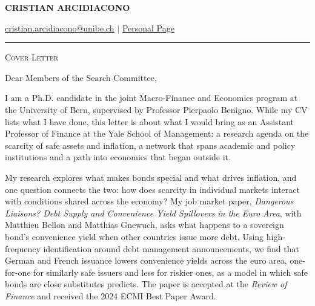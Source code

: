 \documentclass[11pt]{article}
\begin{document}
 
\begin{center}
    \textbf{\large \scshape CRISTIAN ARCIDIACONO}
\end{center}

\begin{center}
    {\href{mailto:cristian.arcidiacono@unibe.ch}{cristian.arcidiacono@unibe.ch} $\vert$ \href{https://sites.google.com/view/cristian-arcidiacono/home}{Personal Page}}
\end{center}
\vspace{-0.2cm}
\noindent\rule{\textwidth}{0.4pt}

\vspace{0.2cm}

\begin{center}
    {\large \scshape Cover Letter}
\end{center}

\vspace{0.3cm}

Dear Members of the Search Committee,

I am a Ph.D. candidate in the joint Macro-Finance and Economics program at the University of Bern, supervised by Professor Pierpaolo Benigno. While my CV lists what I have done, this letter is about what I would bring as an Assistant Professor of Finance at the Yale School of Management: a research agenda on the scarcity of safe assets and inflation, a network that spans academic and policy institutions and a path into economics that began outside it.

My research explores what makes bonds special and what drives inflation, and one question connects the two: how does scarcity in individual markets interact with conditions shared across the economy? My job market paper, \textit{Dangerous Liaisons? Debt Supply and Convenience Yield Spillovers in the Euro Area}, with Matthieu Bellon and Matthias Gnewuch, asks what happens to a sovereign bond's convenience yield when other countries issue more debt. Using high-frequency identification around debt management announcements, we find that German and French issuance lowers convenience yields across the euro area, one-for-one for similarly safe issuers and less for riskier ones, as a model in which safe bonds are close substitutes predicts. The paper is accepted at the \textit{Review of Finance} and received the 2024 ECMI Best Paper Award.
\end{document}
